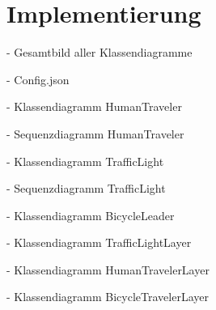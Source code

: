 %


\chapter{Implementierung}\label{ch:implementierung}

- Gesamtbild aller Klassendiagramme

- Config.json

- Klassendiagramm HumanTraveler

- Sequenzdiagramm HumanTraveler

- Klassendiagramm TrafficLight

- Sequenzdiagramm TrafficLight

- Klassendiagramm BicycleLeader

- Klassendiagramm TrafficLightLayer

- Klassendiagramm HumanTravelerLayer

- Klassendiagramm BicycleTravelerLayer
%
%
%
